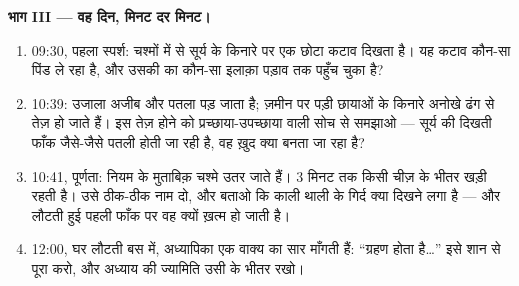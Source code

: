 \begin{problem}
\medskip\noindent\textbf{भाग III --- वह दिन, मिनट दर मिनट।}
\begin{enumerate}[resume]
  \item 09:30, पहला स्पर्श: चश्मों में से सूर्य के किनारे पर एक छोटा
        कटाव दिखता है। यह कटाव कौन-सा पिंड ले रहा है, और उसकी  का
        कौन-सा इलाक़ा पड़ाव तक पहुँच चुका है?
  \item 10:39: उजाला अजीब और पतला पड़ जाता है; ज़मीन पर पड़ी छायाओं के
        किनारे अनोखे ढंग से तेज़ हो जाते हैं। इस तेज़ होने को
        प्रच्छाया-उपच्छाया वाली सोच से समझाओ --- सूर्य की दिखती फाँक
        जैसे-जैसे पतली होती जा रही है, वह ख़ुद क्या बनता जा रहा है?
  \item 10:41, पूर्णता: नियम के मुताबिक़ चश्मे उतर जाते हैं। $3$
        मिनट तक  किसी चीज़ के भीतर खड़ी रहती है। उसे ठीक-ठीक नाम
        दो, और बताओ कि काली थाली के गिर्द क्या दिखने लगा है --- और
        लौटती हुई पहली फाँक पर वह  क्यों ख़त्म हो जाती है।
  \item 12:00, घर लौटती बस में, अध्यापिका एक वाक्य का सार माँगती हैं:
        ``ग्रहण होता है\dots'' इसे शान से पूरा करो, और अध्याय की
        ज्यामिति उसी के भीतर रखो।
\end{enumerate}
\end{problem}
